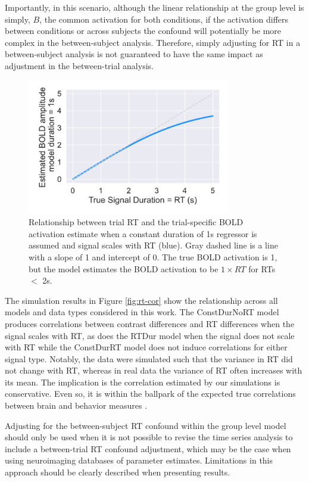 \documentclass[titlepage,12pt] {article}
\begin{document}
Importantly, in this scenario, although the linear relationship at the group level is simply, $B$, the common activation for both conditions, if the activation differs between conditions or across subjects the confound will potentially be more complex in the between-subject analysis.  Therefore, simply adjusting for RT in a between-subject analysis is not guaranteed to have the same impact as adjustment in the between-trial analysis.

\begin{figure}
  \centering
   \includegraphics[width=3.5in]{Figures/bold_fcn_rt_1sdur_only.pdf}
   \caption{Relationship between trial RT and the trial-specific BOLD activation estimate when a constant duration of 1s regressor is assumed and signal scales with RT (blue).  Gray dashed line is a line with a slope of 1 and intercept of 0.  The true BOLD activation is 1, but the model estimates the BOLD activation to be $1\times RT$ for RTs $<$ 2s.}
  \label{fig:bold_rt}
\end{figure}


The simulation results in Figure \ref{fig:rt-cor} show the relationship across all models and data types considered in this work. The ConstDurNoRT model produces correlations between contrast differences and RT differences when the signal scales with RT, as does the RTDur model when the signal does not scale with RT while the ConstDurRT model does not induce correlations for either signal type.  Notably, the data were simulated such that the variance in RT did not change with RT, whereas in real data the variance of RT often increases with its mean.  The implication is the correlation estimated by our simulations is conservative.  Even so, it is within the ballpark of the expected true correlations between brain and behavior measures \citep{marekReproducibleBrainwideAssociation2022}.  

Adjusting for the between-subject RT confound within the group level model should only be used when it is not possible to revise the time series analysis to include a between-trial RT confound adjustment, which may be the case when using neuroimaging databases of parameter estimates.  Limitations in this approach should be clearly described when presenting results.
\end{document}
